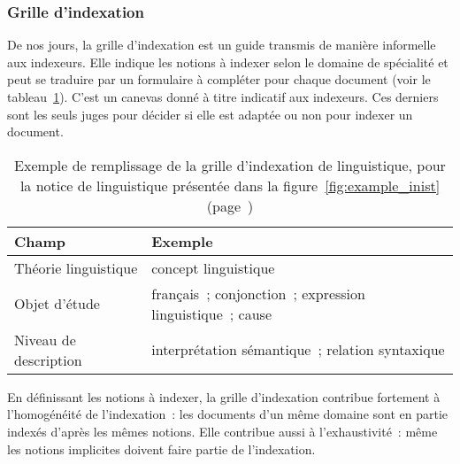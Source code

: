     \subsubsection{Grille d'indexation}
    \label{subsubsec:main-domain_specific_keyphrase_annotation-manual_keyphrase_annotation-resources-indexing_guidelines}
      De nos jours, la grille d'indexation est un guide transmis de manière
      informelle aux indexeurs. Elle indique les notions à indexer selon le
      domaine de spécialité et peut se traduire par un formulaire à compléter
      pour chaque document (voir le tableau~\ref{fig:indexing_grid}). C'est un
      canevas donné à titre indicatif aux indexeurs. Ces derniers sont les
      seuls juges pour décider si elle est adaptée ou non pour indexer un
      document.
      \begin{table}[h!]
        \centering
        \begin{tabular}{l|l}
          \toprule
          \textbf{Champ} & \textbf{Exemple}\\
          \hline
          Théorie linguistique & concept linguistique\\
          Objet d'étude & français~; conjonction~; expression linguistique~; cause\\
          Niveau de description & interprétation sémantique~; relation syntaxique\\
          \bottomrule
        \end{tabular}
        \caption[
          Exemple de remplissage de la grille d'indexation de linguistique
        ]{
          Exemple de remplissage de la grille d'indexation de linguistique,
          pour la notice de linguistique présentée dans la
          figure~\ref{fig:example_inist} (page~\pageref{fig:example_inist})
          \label{fig:indexing_grid}
        }
      \end{table}

      En définissant les notions à indexer, la grille d'indexation contribue
      fortement à l'homogénéité de l'indexation~: les documents d'un même
      domaine sont en partie indexés d'après les mêmes notions. Elle contribue
      aussi à l'exhaustivité~: même les notions implicites doivent faire
      partie de l'indexation.

